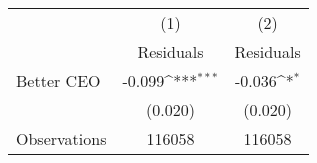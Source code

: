 {
\def\sym#1{\ifmmode^{#1}\else\(^{#1}\)\fi}
\begin{tabular}{l*{2}{c}}
\hline\hline
                    &\multicolumn{1}{c}{(1)}&\multicolumn{1}{c}{(2)}\\
                    &\multicolumn{1}{c}{Residuals}&\multicolumn{1}{c}{Residuals}\\
\hline
Better CEO          &      -0.099\sym{***}&      -0.036\sym{*}  \\
                    &     (0.020)         &     (0.020)         \\
\hline
Observations        &      116058         &      116058         \\
\hline\hline
\end{tabular}
}
